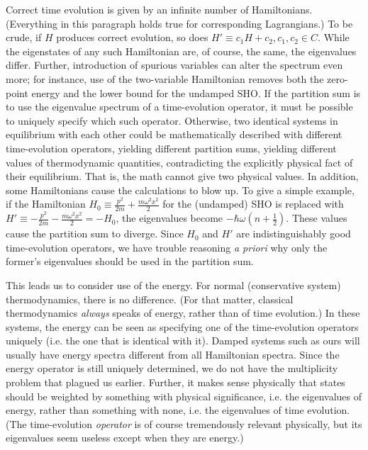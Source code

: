 Correct time evolution is given by an infinite number of Hamiltonians. 
(Everything in this paragraph holds true for corresponding Lagrangians.)
To be crude, if $H$ produces correct evolution, so does $H' \equiv c_{1} H + 
c_{2}, c_{1}, c_{2} \in C$.  While the eigenstates of any such Hamiltonian 
are, of course, the same, the eigenvalues differ.  Further, introduction of 
spurious variables can alter the spectrum even more; for instance, use of the
two-variable Hamiltonian removes both the zero-point energy and the lower
bound for the undamped SHO.  If the partition sum is to use the eigenvalue
spectrum of a time-evolution operator, it must be possible to uniquely specify
which such operator.  Otherwise, two identical systems in equilibrium with
each other could be mathematically described with different time-evolution
operators, yielding different partition sums, yielding different values of
thermodynamic quantities, contradicting the explicitly physical fact of their
equilibrium.  That is, the math cannot give two physical values.  In addition,
some Hamiltonians cause the calculations to blow up.  To give a simple
example, if the Hamiltonian $H_{0} \equiv \frac{p^2}{2 m} + \frac{m \omega^2
x^2}{2}$ for the (undamped) SHO is replaced with $H' \equiv - \frac{p^2}{2 m}
- \frac{m \omega^2 x^2}{2} = - H_{0}$, the eigenvalues become $- \hbar \omega
(n + \frac{1}{2})$.  These values cause the partition sum to diverge.  Since
$H_{0}$ and $H'$ are indistinguishably good time-evolution operators, we have
trouble reasoning {\em a priori} why only the former's eigenvalues should be 
used in the partition sum.

This leads us to consider use of the energy.  For normal (conservative system)
thermodynamics, there is no difference.  (For that matter, classical 
thermodynamics {\em always} speaks of energy, rather than of time evolution.)
In these systems, the energy can be seen as specifying one of the
time-evolution operators uniquely (i.e. the one that is identical with it).
Damped systems such as ours will usually have energy spectra different from
all Hamiltonian spectra.  Since the energy operator is still uniquely 
determined, we do not have the multiplicity problem that plagued us earlier.
Further, it makes sense physically that states should be weighted by something
with physical significance, i.e. the eigenvalues of energy, rather than 
something with none, i.e. the eigenvalues of time evolution.  (The 
time-evolution {\em operator} is of course tremendously relevant physically,
but its eigenvalues seem useless except when they are energy.)


